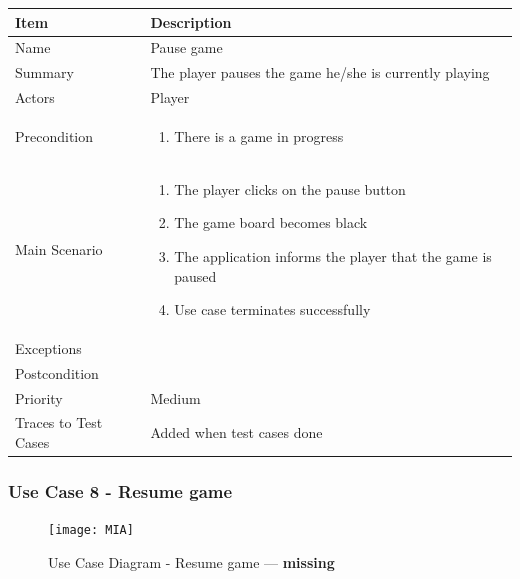 \documentclass[12pt]{article}
\begin{document}
\begin{center}
\setlength{\tabcolsep}{18pt}
\renewcommand{\arraystretch}{1.3}
\begin{tabular}{ |p{3cm}|p{10cm}| }
    \hline
    \rowcolor{green}
   Item & Description \\
    \hline
    Name & Pause game \\
    \hline
    Summary & The player pauses the game he/she is currently playing \\
    \hline
    Actors & Player \\
    \hline
    Precondition & 
    \vspace*{-0.2in}
    \begin{enumerate}
        \item There is a game in progress
    \end{enumerate}  \\
    \hline
    Main Scenario &     
    \vspace*{-0.2in}
    \begin{enumerate}
        \item The player clicks on the pause button
        \item The game board becomes black
        \item The application informs the player that the game is paused
        \item Use case terminates successfully
    \end{enumerate}  \\
    \hline
    Exceptions &  \\
    \hline
    Postcondition & \\
    \hline
    Priority & Medium  \\
    \hline
    Traces to Test Cases & Added when test cases done  \\
    \hline
\end{tabular}
\end{center}

\newpage


\subsubsection{Use Case 8 - Resume game} \label{uc:8}

\begin{figure}[htbp]
    \centering
    \texttt{[image: MIA]}
    \caption{Use Case Diagram - Resume game --- \textbf{missing}}
    \label{fig:MIA}
\end{figure}
\end{document}
